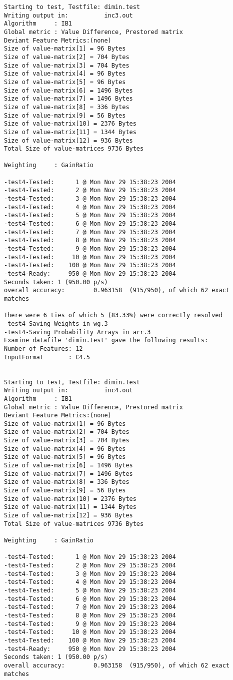 \begin{footnotesize}
\begin{verbatim}
Starting to test, Testfile: dimin.test
Writing output in:          inc3.out
Algorithm     : IB1
Global metric : Value Difference, Prestored matrix
Deviant Feature Metrics:(none)
Size of value-matrix[1] = 96 Bytes 
Size of value-matrix[2] = 704 Bytes 
Size of value-matrix[3] = 704 Bytes 
Size of value-matrix[4] = 96 Bytes 
Size of value-matrix[5] = 96 Bytes 
Size of value-matrix[6] = 1496 Bytes 
Size of value-matrix[7] = 1496 Bytes 
Size of value-matrix[8] = 336 Bytes 
Size of value-matrix[9] = 56 Bytes 
Size of value-matrix[10] = 2376 Bytes 
Size of value-matrix[11] = 1344 Bytes 
Size of value-matrix[12] = 936 Bytes 
Total Size of value-matrices 9736 Bytes 

Weighting     : GainRatio

-test4-Tested:      1 @ Mon Nov 29 15:38:23 2004
-test4-Tested:      2 @ Mon Nov 29 15:38:23 2004
-test4-Tested:      3 @ Mon Nov 29 15:38:23 2004
-test4-Tested:      4 @ Mon Nov 29 15:38:23 2004
-test4-Tested:      5 @ Mon Nov 29 15:38:23 2004
-test4-Tested:      6 @ Mon Nov 29 15:38:23 2004
-test4-Tested:      7 @ Mon Nov 29 15:38:23 2004
-test4-Tested:      8 @ Mon Nov 29 15:38:23 2004
-test4-Tested:      9 @ Mon Nov 29 15:38:23 2004
-test4-Tested:     10 @ Mon Nov 29 15:38:23 2004
-test4-Tested:    100 @ Mon Nov 29 15:38:23 2004
-test4-Ready:     950 @ Mon Nov 29 15:38:23 2004
Seconds taken: 1 (950.00 p/s)
overall accuracy:        0.963158  (915/950), of which 62 exact matches 

There were 6 ties of which 5 (83.33%) were correctly resolved
-test4-Saving Weights in wg.3
-test4-Saving Probability Arrays in arr.3
Examine datafile 'dimin.test' gave the following results:
Number of Features: 12
InputFormat       : C4.5


Starting to test, Testfile: dimin.test
Writing output in:          inc4.out
Algorithm     : IB1
Global metric : Value Difference, Prestored matrix
Deviant Feature Metrics:(none)
Size of value-matrix[1] = 96 Bytes 
Size of value-matrix[2] = 704 Bytes 
Size of value-matrix[3] = 704 Bytes 
Size of value-matrix[4] = 96 Bytes 
Size of value-matrix[5] = 96 Bytes 
Size of value-matrix[6] = 1496 Bytes 
Size of value-matrix[7] = 1496 Bytes 
Size of value-matrix[8] = 336 Bytes 
Size of value-matrix[9] = 56 Bytes 
Size of value-matrix[10] = 2376 Bytes 
Size of value-matrix[11] = 1344 Bytes 
Size of value-matrix[12] = 936 Bytes 
Total Size of value-matrices 9736 Bytes 

Weighting     : GainRatio

-test4-Tested:      1 @ Mon Nov 29 15:38:23 2004
-test4-Tested:      2 @ Mon Nov 29 15:38:23 2004
-test4-Tested:      3 @ Mon Nov 29 15:38:23 2004
-test4-Tested:      4 @ Mon Nov 29 15:38:23 2004
-test4-Tested:      5 @ Mon Nov 29 15:38:23 2004
-test4-Tested:      6 @ Mon Nov 29 15:38:23 2004
-test4-Tested:      7 @ Mon Nov 29 15:38:23 2004
-test4-Tested:      8 @ Mon Nov 29 15:38:23 2004
-test4-Tested:      9 @ Mon Nov 29 15:38:23 2004
-test4-Tested:     10 @ Mon Nov 29 15:38:23 2004
-test4-Tested:    100 @ Mon Nov 29 15:38:23 2004
-test4-Ready:     950 @ Mon Nov 29 15:38:23 2004
Seconds taken: 1 (950.00 p/s)
overall accuracy:        0.963158  (915/950), of which 62 exact matches 


\end{verbatim}
\end{footnotesize}

